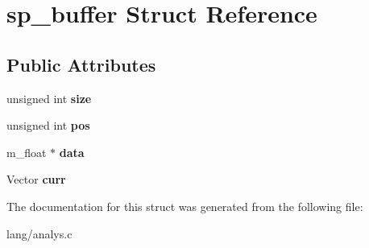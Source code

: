 \hypertarget{structsp__buffer}{}\section{sp\+\_\+buffer Struct Reference}
\label{structsp__buffer}
\subsection*{Public Attributes}
\begin{DoxyCompactItemize}
\item 
\hypertarget{structsp__buffer_a5b43da61df9214159f384c7e4cbfb9d7}{}\label{structsp__buffer_a5b43da61df9214159f384c7e4cbfb9d7} 
unsigned int {\bfseries size}
\item 
\hypertarget{structsp__buffer_ace71e2825254112b49cde50d650d2d69}{}\label{structsp__buffer_ace71e2825254112b49cde50d650d2d69} 
unsigned int {\bfseries pos}
\item 
\hypertarget{structsp__buffer_ab5500ffe33d65ea0b6821934b3bc9d19}{}\label{structsp__buffer_ab5500ffe33d65ea0b6821934b3bc9d19} 
m\+\_\+float $\ast$ {\bfseries data}
\item 
\hypertarget{structsp__buffer_ad28a9081c1d6cf987c51ab5f5fc9eb4f}{}\label{structsp__buffer_ad28a9081c1d6cf987c51ab5f5fc9eb4f} 
Vector {\bfseries curr}
\end{DoxyCompactItemize}


The documentation for this struct was generated from the following file\+:\begin{DoxyCompactItemize}
\item 
lang/analys.\+c\end{DoxyCompactItemize}
